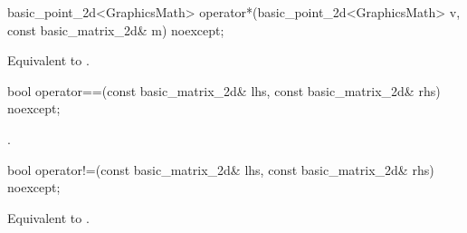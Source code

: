 %
\begin{itemdecl}
basic_point_2d<GraphicsMath> operator*(basic_point_2d<GraphicsMath> v, const basic_matrix_2d& m) noexcept;
\end{itemdecl}
\begin{itemdescr}
\pnum
\returns
Equivalent to .
\end{itemdescr}

%
\begin{itemdecl}
bool operator==(const basic_matrix_2d& lhs, const basic_matrix_2d& rhs) noexcept;
\end{itemdecl}
\begin{itemdescr}
\pnum
\returns
{}.
\end{itemdescr}

%
\begin{itemdecl}
bool operator!=(const basic_matrix_2d& lhs, const basic_matrix_2d& rhs) noexcept;
\end{itemdecl}
\begin{itemdescr}
\pnum
\returns
Equivalent to .
\end{itemdescr}
